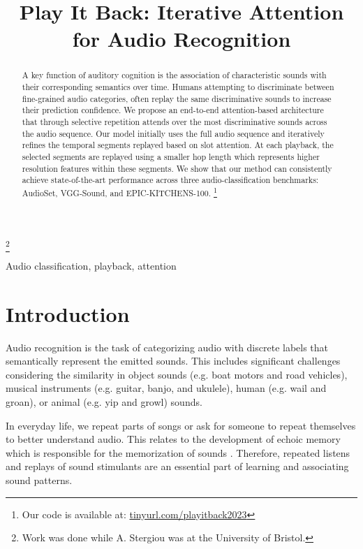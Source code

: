 \documentclass{article}
\title{Play It Back: Iterative Attention for Audio Recognition}
\begin{document}
\maketitle

{\let\thefootnote\relax\footnote{{Work was done while A. Stergiou was at the University of Bristol.}}}
\setcounter{footnote}{0}

\vspace*{-20pt}
\begin{abstract}
A key function of auditory cognition is the association of characteristic sounds with their corresponding semantics over time.
Humans attempting to discriminate between fine-grained audio categories, often replay the same discriminative sounds to increase their prediction confidence.
We propose an end-to-end attention-based architecture that through selective repetition attends over the most discriminative sounds across the audio sequence. Our model initially uses the full audio sequence and iteratively refines the temporal segments replayed based on slot attention. At each playback, the selected segments are replayed using a smaller hop length which represents higher resolution features within these segments. 
We show that our method can consistently achieve state-of-the-art performance across three audio-classification benchmarks: AudioSet, VGG-Sound, and EPIC-KITCHENS-100. \protect\footnote{Our code is available at: \url{tinyurl.com/playitback2023}}
\end{abstract}
\begin{keywords}
Audio classification, playback, attention
\end{keywords}


\section{Introduction}
\label{sec:intro}

Audio recognition is the task of categorizing audio with discrete labels that semantically represent the emitted sounds. This includes significant challenges considering the similarity in object sounds (e.g. boat motors and road vehicles), musical instruments (e.g. guitar, banjo, and ukulele), human (e.g. wail and groan), or animal (e.g. yip and growl) sounds. 



In everyday life, we repeat parts of songs or ask for someone to repeat themselves to better understand audio. This relates to the development of echoic memory which is responsible for the memorization of sounds \cite{clark1987echoic,strous1995auditory}. Therefore, repeated listens and replays of sound stimulants \cite{radvansky2005human} are an essential part of learning and associating sound patterns.  
\end{document}
